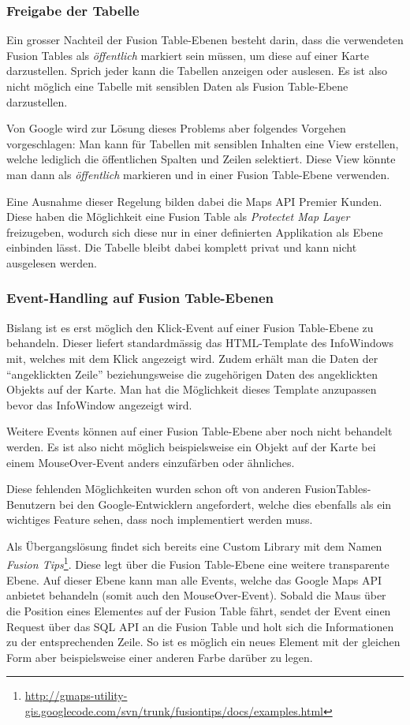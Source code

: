 \subsubsection{Freigabe der Tabelle}
Ein grosser Nachteil der Fusion Table-Ebenen besteht darin, dass die verwendeten Fusion Tables als  \emph{öffentlich} markiert sein müssen, um diese auf einer Karte darzustellen. Sprich jeder kann die Tabellen anzeigen oder auslesen. Es ist also nicht möglich eine Tabelle mit sensiblen Daten als Fusion Table-Ebene darzustellen.

Von Google wird zur Lösung dieses Problems aber folgendes Vorgehen vorgeschlagen: Man kann für Tabellen mit sensiblen Inhalten eine View erstellen, welche lediglich die öffentlichen Spalten und Zeilen selektiert. Diese View könnte man dann als \emph{öffentlich} markieren und in einer Fusion Table-Ebene verwenden.

Eine Ausnahme dieser Regelung bilden dabei die Maps API Premier Kunden. Diese haben die Möglichkeit eine Fusion Table als \emph{Protectet Map Layer} freizugeben, wodurch sich diese nur in einer definierten Applikation als Ebene einbinden lässt. Die Tabelle bleibt dabei komplett privat und kann nicht ausgelesen werden.

\subsubsection{Event-Handling auf Fusion Table-Ebenen}
Bislang ist es erst möglich den Klick-Event auf einer Fusion Table-Ebene zu behandeln. Dieser liefert standardmässig das HTML-Template des InfoWindows mit, welches mit dem Klick angezeigt wird. Zudem erhält man die Daten der "`angeklickten Zeile"' beziehungsweise die zugehörigen Daten des angeklickten Objekts auf der Karte. Man hat die Möglichkeit dieses Template anzupassen bevor das InfoWindow angezeigt wird.

Weitere Events können auf einer Fusion Table-Ebene aber noch nicht behandelt werden. Es ist also nicht möglich beispielsweise ein Objekt auf der Karte bei einem MouseOver-Event anders einzufärben oder ähnliches.

Diese fehlenden Möglichkeiten wurden schon oft von anderen FusionTables-Benutzern bei den Google-Entwicklern angefordert, welche dies ebenfalls als ein wichtiges Feature sehen, dass noch implementiert werden muss.

Als Übergangslösung findet sich bereits eine Custom Library mit dem Namen \emph{Fusion Tips}\footnote{\url{http://gmaps-utility-gis.googlecode.com/svn/trunk/fusiontips/docs/examples.html}}. Diese legt über die Fusion Table-Ebene eine weitere transparente Ebene. Auf dieser Ebene kann man alle Events, welche das Google Maps API anbietet behandeln (somit auch den MouseOver-Event). Sobald die Maus über die Position eines Elementes auf der Fusion Table fährt, sendet der Event einen Request über das SQL API an die Fusion Table und holt sich die Informationen zu der entsprechenden Zeile. So ist es möglich ein neues Element mit der gleichen Form aber beispielsweise einer anderen Farbe darüber zu legen.

